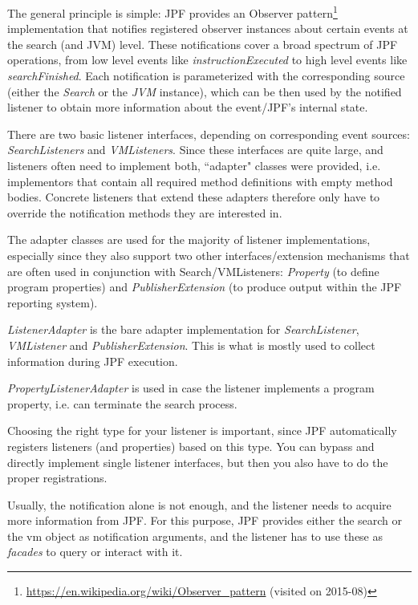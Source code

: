 The general principle is simple: JPF provides an Observer pattern\footnote{\url{https://en.wikipedia.org/wiki/Observer_pattern} (visited on 2015-08)} implementation that notifies registered observer instances about certain events at the search (and JVM) level. These notifications cover a broad spectrum of JPF operations, from low level events like \textit{instructionExecuted} to high level events like \textit{searchFinished}. Each notification is parameterized with the corresponding source (either the \textit{Search} or the \textit{JVM} instance), which can be then used by the notified listener to obtain more information about the event/JPF's internal state.
 
There are two basic listener interfaces, depending on corresponding event sources: \textit{SearchListeners} and \textit{VMListeners}. Since these interfaces are quite large, and listeners often need to implement both, ``adapter" classes were provided, i.e. implementors that contain all required method definitions with empty method bodies. Concrete listeners that extend these adapters therefore only have to override the notification methods they are interested in.

The adapter classes are used for the majority of listener implementations, especially since they also support two other interfaces/extension mechanisms that are often used in conjunction with Search/VMListeners: \textit{Property} (to define program properties) and \textit{PublisherExtension} (to produce output within the JPF reporting system).
 
\textit{ListenerAdapter} is the bare adapter implementation for \textit{SearchListener}, \textit{VMListener} and \textit{PublisherExtension}. This is what is mostly used to collect information during JPF execution.
 
\textit{PropertyListenerAdapter} is used in case the listener implements a program property, i.e. can terminate the search process. 

Choosing the right type for your listener is important, since JPF automatically registers listeners (and properties) based on this type. You can bypass and directly implement single listener interfaces, but then you also have to do the proper registrations.

Usually, the notification alone is not enough, and the listener needs to acquire more information from JPF. For this purpose, JPF provides either the search or the vm object as notification arguments, and the listener has to use these as \textit{facades} to query or interact with it.